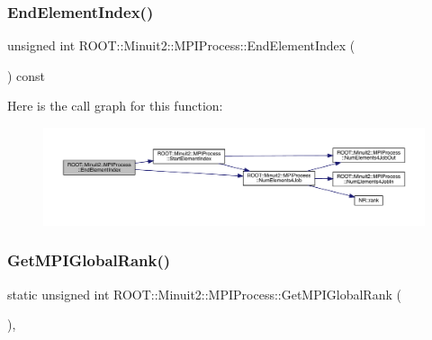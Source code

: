 \subsubsection{\texorpdfstring{EndElementIndex()}{EndElementIndex()}\hspace{0.1cm}{\footnotesize\ttfamily [2/2]}}
{\footnotesize\ttfamily unsigned int R\+O\+O\+T\+::\+Minuit2\+::\+M\+P\+I\+Process\+::\+End\+Element\+Index (\begin{DoxyParamCaption}{ }\end{DoxyParamCaption}) const\hspace{0.3cm}{\ttfamily [inline]}}

Here is the call graph for this function\+:
\nopagebreak
\begin{figure}[H]
\begin{center}
\leavevmode
\includegraphics[width=350pt]{dc/d43/classROOT_1_1Minuit2_1_1MPIProcess_af4445148831dec4961d5f8aa99aeb2c1_cgraph}
\end{center}
\end{figure}
\mbox{\label{classROOT_1_1Minuit2_1_1MPIProcess_aa7c524a7980698bf9bba3a652e2f9a13}} 
\subsubsection{\texorpdfstring{GetMPIGlobalRank()}{GetMPIGlobalRank()}\hspace{0.1cm}{\footnotesize\ttfamily [1/2]}}
{\footnotesize\ttfamily static unsigned int R\+O\+O\+T\+::\+Minuit2\+::\+M\+P\+I\+Process\+::\+Get\+M\+P\+I\+Global\+Rank (\begin{DoxyParamCaption}{ }\end{DoxyParamCaption})\hspace{0.3cm}{\ttfamily [inline]}, {\ttfamily [static]}}


